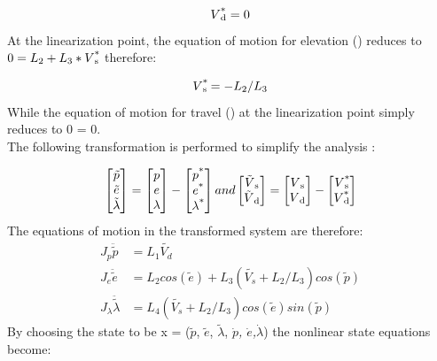 \begin{equation}
  V\SPSB{*}{d} = 0
\end{equation}
At the linearization point, the equation of motion for elevation
() reduces to $0 = L\SB{2} +
L\SB{3}*V\SPSB{*}{s}$ therefore:

\begin{equation}
  V\SPSB{*}{s} = -L\SB{2} / L\SB{3}
\end{equation}
While the equation of motion for travel () at the linearization point simply reduces to 0 = 0.\\
The following transformation is performed to simplify the analysis
:

\begin{equation}
  \begin{bmatrix}
    \tilde{p} \\
    \tilde{e} \\
    \tilde{\lambda}
  \end{bmatrix}
  =
  \begin{bmatrix}
    p \\
    e \\
    \lambda
  \end{bmatrix}
  -
  \begin{bmatrix}
    p\SP{*} \\
    e\SP{*} \\
    \lambda\SP{*}
  \end{bmatrix}
  and
  \begin{bmatrix}
    \tilde{V}\SB{s} \\
    \tilde{V}\SB{d}
  \end{bmatrix}
  =
  \begin{bmatrix}
    V\SB{s} \\
    V\SB{d}
  \end{bmatrix}
  -
  \begin{bmatrix}
    V\SPSB{*}{s} \\
    V\SPSB{*}{d}
  \end{bmatrix}
\end{equation}
The equations of motion in the transformed system are therefore:
\begin{subequations}
  \begin{align}
    J_p\ddot{\tilde{p}} &= L_1\tilde{V_d} \\
    J_e\ddot{\tilde{e}} &= L_2cos(\tilde{e}) + L_3(\tilde{V_s}+L_2/L_3)cos(\tilde{p}) \\
    J_{\lambda}\ddot{\tilde{\lambda}} &= L_4(\tilde{V_s}+L_2/L_3)cos(\tilde{e})sin(\tilde{p})
  \end{align}
\end{subequations}
By choosing the state to be x = ($\tilde{p}$, $\tilde{e}$,
$\tilde{\lambda}$, \textit{$\dot{p}$, $\dot{e}$,$\dot{\lambda}$}) the
nonlinear state equations become:

